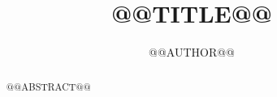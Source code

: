 \documentclass[12pt, a4paper]{article}
\title{@@TITLE@@}
\author{@@AUTHOR@@}
\date{}
\begin{document}
\maketitle

\begin{abstract}
\noindent @@ABSTRACT@@
\end{abstract}
\end{document}
